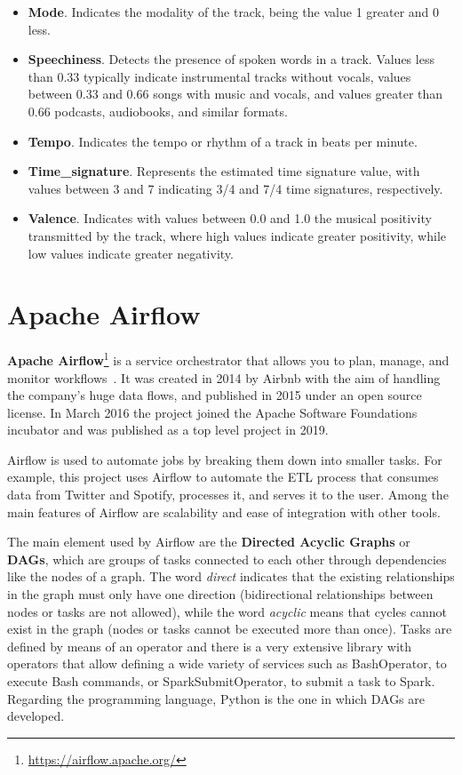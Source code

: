 \begin{itemize}
\begin{itemize}
		\item \textbf{Mode}. Indicates the modality of the track, being the value 1 greater and 0 less.
		\item \textbf{Speechiness}. Detects the presence of spoken words in a track. Values less than 0.33 typically indicate instrumental tracks without vocals, values between 0.33 and 0.66 songs with music and vocals, and values greater than 0.66 podcasts, audiobooks, and similar formats.
		\item \textbf{Tempo}. Indicates the tempo or rhythm of a track in beats per minute.
		\item \textbf{Time\_signature}. Represents the estimated time signature value, with values between 3 and 7 indicating 3/4 and 7/4 time signatures, respectively.
		\item \textbf{Valence}. Indicates with values between 0.0 and 1.0 the musical positivity transmitted by the track, where high values indicate greater positivity, while low values indicate greater negativity.
	\end{itemize}
\end{itemize}

\section{Apache Airflow}

\nonzeroparskip \textbf{Apache Airflow}\footnote{\url{https://airflow.apache.org/}} is a service orchestrator that allows you to plan, manage, and monitor workflows~\cite{airflow}. It was created in 2014 by Airbnb with the aim of handling the company's huge data flows, and published in 2015 under an open source license. In March 2016 the project joined the Apache Software Foundations incubator and was published as a top level project in 2019.

\nonzeroparskip Airflow is used to automate jobs by breaking them down into smaller tasks. For example, this project uses Airflow to automate the ETL process that consumes data from Twitter and Spotify, processes it, and serves it to the user. Among the main features of Airflow are scalability and ease of integration with other tools.

\nonzeroparskip The main element used by Airflow are the \textbf{Directed Acyclic Graphs} or \textbf{DAGs}, which are groups of tasks connected to each other through dependencies like the nodes of a graph. The word \textit{direct} indicates that the existing relationships in the graph must only have one direction (bidirectional relationships between nodes or tasks are not allowed), while the word \textit{acyclic} means that cycles cannot exist in the graph (nodes or tasks cannot be executed more than once). Tasks are defined by means of an operator and there is a very extensive library with operators that allow defining a wide variety of services such as BashOperator, to execute Bash commands, or SparkSubmitOperator, to submit a task to Spark. Regarding the programming language, Python is the one in which DAGs are developed.

